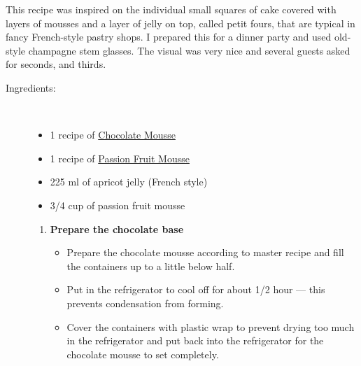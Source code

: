 \documentclass[11pt,letterpaper]{article}
\begin{document}



This recipe was inspired on the individual small squares of cake covered with layers of mousses and a layer of jelly on top, called petit fours, that are typical in fancy French-style pastry shops. I prepared this for a dinner party and used old-style champagne stem glasses. The visual was very nice and several guests asked for seconds, and thirds.
	
\begin{description}
\item[Ingredients:]\ \\
	\begin{itemize}
	\item 1 recipe of \href{ChocolateMousse.html}{Chocolate Mousse}
	\item  1 recipe of \href{PassionFruitMousse.html}{Passion Fruit Mousse}
	\item 225 ml of apricot jelly (French style)
	\item 3/4 cup of passion fruit mousse
	\end{itemize}

	\begin{enumerate}
	\item {\bf Prepare the chocolate base}
		\begin{itemize}
		\item Prepare the chocolate mousse according to master recipe and fill the containers up to a little below half.
		\item Put in the refrigerator to cool off for about 1/2 hour --- this prevents condensation from forming.
		\item Cover the containers with plastic wrap to prevent drying too much in the refrigerator and put back into the refrigerator for the chocolate mousse to set completely.
		\end{itemize}


\end{enumerate}
\end{description}
\end{document}
